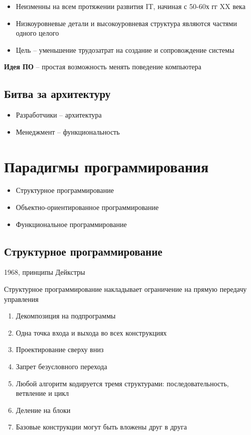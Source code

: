 \begin{itemize}
    \item Неизменны на всем протяжении развития IT, начиная с
        50-60х гг XX века
    \item Низкоуровневые детали и высокоуровневая структура являются
        частями одного целого
    \item Цель -- уменьшение трудозатрат на создание
        и сопровождение системы
\end{itemize}

\textbf{Идея ПО} -- простая возможность менять поведение компьютера

\subsection{Битва за архитектуру}

\begin{itemize}
    \item Разработчики -- архитектура
    \item Менеджмент -- функциональность
\end{itemize}

\section{Парадигмы программирования}

\begin{itemize}
    \item Структурное программирование
    \item Объектно-ориентированное программирование
    \item Функциональное программирование
\end{itemize}

\subsection{Структурное программирование}

1968, принципы Дейкстры

Структурное программирование накладывает ограничение на прямую
передачу управления

\begin{enumerate}
    \item Декомпозиция на подпрограммы
    \item Одна точка входа и выхода во всех конструкциях
    \item Проектирование сверху вниз
    \item Запрет безусловного перехода
    \item Любой алгоритм кодируется тремя структурами:
        последовательность, ветвление и цикл
    \item Деление на блоки
    \item Базовые конструкции могут быть вложены друг в друга
\end{enumerate}

